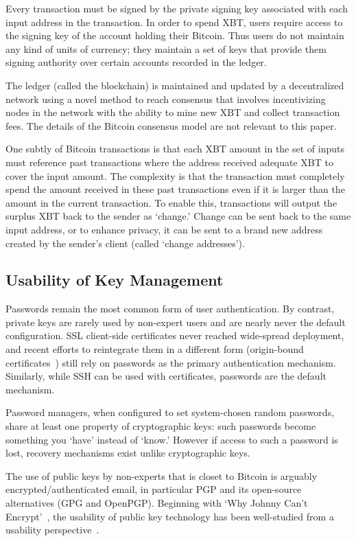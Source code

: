 Every transaction must be signed by the private signing key associated with each input address in the transaction. In order to spend XBT, users require access to the signing key of the account holding their Bitcoin. Thus users do not maintain any kind of units of currency; they maintain a set of keys that provide them signing authority over certain accounts recorded in the ledger. 

The ledger (called the blockchain) is maintained and updated by a decentralized network using a novel method to reach consensus that involves incentivizing nodes in the network with the ability to mine new XBT and collect transaction fees. The details of the Bitcoin consensus model are not relevant to this paper.

One subtly of Bitcoin transactions is that each XBT amount in the set of inputs must reference past transactions where the address received adequate XBT to cover the input amount. The complexity is that the transaction must completely spend the amount received in these past transactions even if it is larger than the amount in the current transaction. To enable this, transactions will output the surplus XBT back to the sender as `change.' Change can be sent back to the same input address, or to enhance privacy, it can be sent to a brand new address created by the sender's client (called `change addresses'). 

\subsection{Usability of Key Management}

Passwords remain the most common form of user authentication. By contrast, private keys are rarely used by non-expert users and are nearly never the default configuration. SSL client-side certificates never reached wide-spread deployment, and recent efforts to reintegrate them in a different form (\eg origin-bound certificates~\cite{}) still rely on passwords as the primary authentication mechanism. Similarly, while SSH can be used with certificates, passwords are the default mechanism.

Password managers, when configured to set system-chosen random passwords, share at least one property of cryptographic keys: such passwords become something you `have' instead of `know.' However if access to such a password is lost, recovery mechanisms exist unlike cryptographic keys.

The use of public keys by non-experts that is closet to Bitcoin is arguably encrypted/authenticated email, in particular PGP and its open-source alternatives (\ie GPG and OpenPGP). Beginning with `Why Johnny Can't Encrypt'~\cite{}, the usability of public key technology has been well-studied from a usability perspective~\cite{}.  


